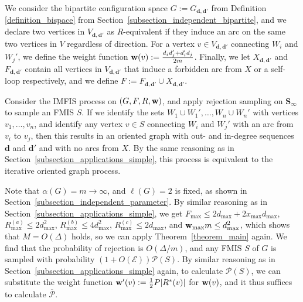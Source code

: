 \documentclass{article}
\theoremstyle{plain}
\theoremstyle{remark}
\theoremstyle{plain}
\numberwithin{equation}{section}
\renewcommand{\d}{{\boldsymbol{d}}}
\renewcommand{\b}{{\bf{w}}}
\begin{document}
	We consider the bipartite configuration space $G:=G_{\d,\d'}$ from Definition \ref{definition_bispace} from Section~\ref{subsection_independent_bipartite}, and we declare two vertices in $V_{\d,\d'}$ as $R$-equivalent if they induce an arc on the same two vertices in $V$ regardless of direction. For a vertex $v\in V_{\d,\d'}$ connecting $W_i$ and $W_j'$, we define the weight function $\b(v):=\tfrac{d_id_j'+d_i'd_j}{2m}$. Finally, we let $X_{\d,\d'}$ and $F_{\d,\d'}$ contain all vertices in $V_{\d,\d'}$ that induce a forbidden arc from $X$ or a self-loop respectively, and we define $F:=F_{\d,\d'}\cup X_{\d,\d'}$.
	
	Consider the IMFIS process on $(G,F,R,\b)$, and apply rejection sampling on $\boldsymbol{S}_{\infty}$ to sample an FMIS $S$. If we identify the sets $W_1\cup W_1',\ldots,W_n\cup W_n'$ with vertices $v_1,\ldots,v_n$, and identify any vertex $v\in S$ connecting $W_i$ and $W_j'$ with an arc from $v_i$ to $v_j$, then this results in an oriented graph with out- and in-degree sequences $\d$ and $\d'$ and with no arcs from $X$. By the same reasoning as in Section~\ref{subsection_applications_simple}, this process is equivalent to the iterative oriented graph process.
	
	Note that $\alpha(G)=m\to\infty$, and $\ell(G)=2$ is fixed, as shown in Section~\ref{subsection_independent_parameter}. By similar reasoning as in Section~\ref{subsection_applications_simple}, we get $F_{\max}\leq2d_{\max}+2x_{\max}d_{\max}$, $R_{\max}^{(a)}\leq2d_{\max}^2$, $R_{\max}^{(b)}\leq4d_{\max}^2$, $R_{\max}^{(c)}\leq2d_{\max}$, and $\b_{\max}m\leq d_{\max}^2$, which shows that $M=O(\Delta)$ holds, so we can apply Theorem~\ref{theorem_main} again. We find that the probability of rejection is $O(\Delta/m)$, and any FMIS $S$ of $G$ is sampled with probability $(1+O(\mathscr{E}))\mathscr{P}(S)$. By similar  reasoning as in Section~\ref{subsection_applications_simple} again, to calculate $\mathscr{P}(S)$, we can substitute the weight function $\b'(v):=\frac12P|R^*(v)|$ for $\b(v)$, and it thus suffices to calculate $\overline{\mathscr{P}}$.
	
\end{document}
